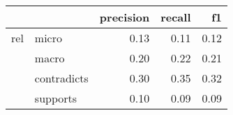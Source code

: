 \begin{tabular}{llrrr}
\toprule
    &          &  precision &  recall &   f1 \\
\midrule
rel & micro &       0.13 &    0.11 & 0.12 \\
    & macro &       0.20 &    0.22 & 0.21 \\
    & contradicts &       0.30 &    0.35 & 0.32 \\
    & supports &       0.10 &    0.09 & 0.09 \\
\bottomrule
\end{tabular}
